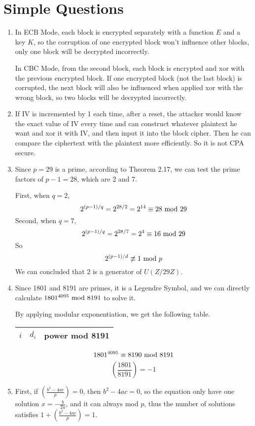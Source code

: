\documentclass{article}
\renewcommand{\mod}{{\rm\ mod\ }}
\begin{document}
\section{Simple Questions}
\begin{enumerate}
\item
In ECB Mode, each block is encrypted separately with a function $E$ and a key $K$, so the corruption of one encrypted block won't influence other blocks, only one block will be decrypted incorrectly.

In CBC Mode, from the second block, each block is encrypted and xor with the previous encrypted block. If one encrypted block (not the last block) is corrupted, the next block will also be influenced when applied xor with the wrong block, so two blocks will be decrypted incorrectly.

\item
If IV is incremented by 1 each time, after a reset, the attacker would know the exact value of IV every time and can construct whatever plaintext he want and xor it with IV, and then input it into the block cipher. Then he can compare the ciphertext with the plaintext more efficiently. So it is not CPA secure.

\item
Since $p=29$ is a prime, according to Theorem 2.17, we can test the prime factors of $p-1=28$, which are 2 and 7. 

First, when $q=2$, $$2^{(p-1)/q}=2^{28/2}=2^{14}\equiv28\mod 29$$
Second, when $q=7$, $$2^{(p-1)/q}=2^{28/7}=2^{4}\equiv16\mod 29$$
So $$2^{(p-1)/d}\not\equiv1\mod p$$
We can concluded that 2 is a generator of $U(Z/29Z)$.

\item
Since 1801 and 8191 are primes, it is a Legendre Symbol, and we can directly calculate $1801^{4095}\mod8191$ to solve it.

By applying modular exponentiation, we get the following table.
\begin{center}
\begin{tabular}{ccc}
$i$ & $d_i$ & power mod 8191 \\\hline

\end{tabular}
\end{center}
$$1801^{4095}\equiv8190\mod8191$$
$$\left(\frac{1801}{8191}\right)=-1$$

\item
First, if $\left(\frac{b^2-4ac}{p}\right)=0$, then $b^2-4ac=0$, so the equation only have one solution $x=-\frac{b}{2a}$, and it can always mod $p$, thus the number of solutions satisfies $1+\left(\frac{b^2-4ac}{p}\right)=1$.


\end{enumerate}
\end{document}
